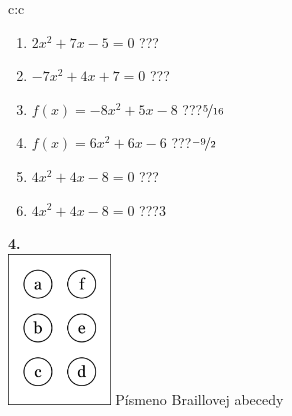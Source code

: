 \documentclass[10pt]{report}
\begin{document}
\begin{tabular}{c:c}
\begin{minipage}[c][104.5mm][t]{0.5\linewidth}
\begin{center}
\begin{minipage}{0.79\linewidth}
\begin{center}
\begin{varwidth}{\linewidth}
\begin{enumerate}
\Large
\item $2x^2+7x-5=0$\quad \dotfill\; ???\;\dotfill {}
\item $-7x^2+4x+7=0$\quad \dotfill\; ???\;\dotfill {}
\item $f(x)=-8x^2+5x-8$\quad \dotfill\; ???\;\dotfill \quad $\nicefrac{5}{16}$
\item $f(x)=6x^2+6x-6$\quad \dotfill\; ???\;\dotfill \quad $\nicefrac{-9}{2}$
\item $4x^2+4x-8=0$\quad \dotfill\; ???\;\dotfill {}
\item $4x^2+4x-8=0$\quad \dotfill\; ???\;\dotfill \quad $3$
\end{enumerate}
\end{varwidth}
\end{center}
\end{minipage}
\begin{minipage}{0.20\linewidth}
\begin{center}
{\Huge\bfseries 4.} \\[2mm]
\includegraphics[height=40mm]{../images/braille.png}
{\small Písmeno Braillovej abecedy}
\end{center}
\end{minipage}
\end{center}
\end{minipage}
%
\end{tabular}
\newpage
\thispagestyle{empty}
\end{document}
